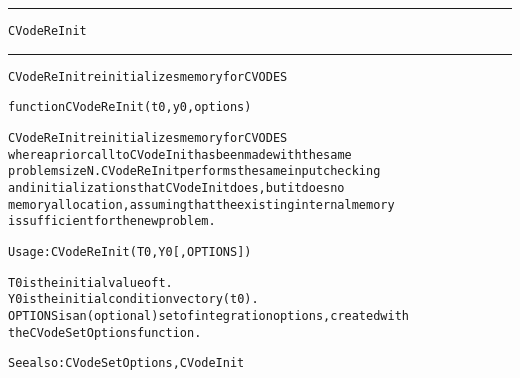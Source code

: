 \begin{samepage}
\hrule
\begin{center}
{\large \verb!CVodeReInit!}
\label{p:CVodeReInit}
\end{center}
\hrule\vspace{0.1in}



\begin{alltt}
CVodeReInit reinitializes memory for CVODES
\end{alltt}

\end{samepage}



\begin{samepage}


\begin{alltt}
function CVodeReInit(t0, y0, options) 
\end{alltt}

\end{samepage}



\begin{alltt}
CVodeReInit reinitializes memory for CVODES
   where a prior call to CVodeInit has been made with the same
   problem size N. CVodeReInit performs the same input checking
   and initializations that CVodeInit does, but it does no 
   memory allocation, assuming that the existing internal memory 
   is sufficient for the new problem.

   Usage: CVodeReInit ( T0, Y0 [, OPTIONS ] ) 

   T0       is the initial value of t.
   Y0       is the initial condition vector y(t0).  
   OPTIONS  is an (optional) set of integration options, created with
            the CVodeSetOptions function. 

   See also: CVodeSetOptions, CVodeInit
\end{alltt}






\vspace{0.1in}